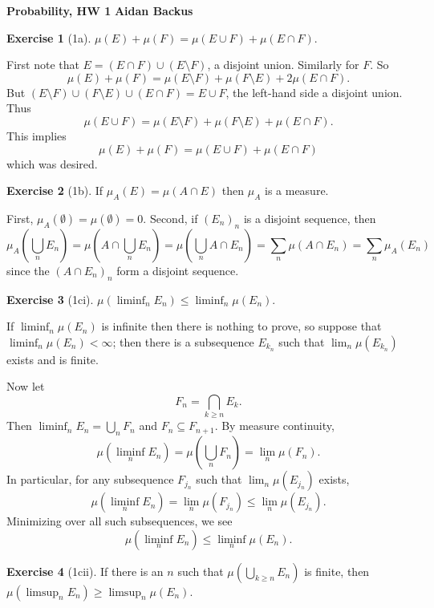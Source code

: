 \documentclass[10pt]{article}
\theoremstyle{definition}
\newtheorem{exer}{Exercise}
\begin{document}
\noindent
\large\textbf{Probability, HW 1} \hfill \textbf{Aidan Backus} \\


\begin{exer}[1a]
$\mu(E) + \mu(F) = \mu(E \cup F) + \mu(E \cap F)$.
\end{exer}
First note that $E = (E \cap F) \cup (E \setminus F)$, a disjoint union. Similarly for $F$. So
$$\mu(E) + \mu(F) = \mu(E \setminus F) + \mu(F \setminus E) + 2 \mu(E \cap F).$$
But $(E \setminus F) \cup (F \setminus E) \cup (E \cap F) = E \cup F$, the left-hand side a disjoint union. Thus
$$\mu(E \cup F) = \mu(E \setminus F) + \mu(F \setminus E) + \mu(E \cap F).$$
This implies
$$\mu(E) + \mu(F) = \mu(E \cup F) + \mu(E \cap F)$$
which was desired.

\begin{exer}[1b]
If $\mu_A(E) = \mu(A \cap E)$ then $\mu_A$ is a measure.
\end{exer}

First, $\mu_A(\emptyset) = \mu(\emptyset) = 0$. Second, if $(E_n)_n$ is a disjoint sequence, then
$$\mu_A\left(\bigcup_n E_n\right) = \mu\left(A \cap \bigcup_n E_n\right) = \mu\left(\bigcup_n A \cap E_n\right) = \sum_n \mu(A \cap E_n) = \sum_n \mu_A(E_n)$$
since the $(A \cap E_n)_n$ form a disjoint sequence.

\begin{exer}[1ci]
$\mu(\liminf_n E_n) \leq \liminf_n \mu(E_n)$.
\end{exer}

If $\liminf_n \mu(E_n)$ is infinite then there is nothing to prove, so suppose that $\liminf_n \mu(E_n) < \infty$; then there is a subsequence $E_{k_n}$ such that $\lim_n \mu(E_{k_n})$ exists and is finite.

Now let
$$F_n = \bigcap_{k \geq n} E_k.$$
Then $\liminf_n E_n = \bigcup_n F_n$ and $F_n \subseteq F_{n+1}$. By measure continuity,
$$\mu\left(\liminf_n E_n\right) = \mu\left(\bigcup_n F_n\right) = \lim_n \mu(F_n).$$
In particular, for any subsequence $F_{j_n}$ such that $\lim_n \mu(E_{j_n})$ exists,
$$\mu\left(\liminf_n E_n\right) = \lim_n \mu(F_{j_n}) \leq \lim_n \mu(E_{j_n}).$$
Minimizing over all such subsequences, we see
$$\mu\left(\liminf_n E_n\right) \leq \liminf_n \mu(E_n).$$

\begin{exer}[1cii]
If there is an $n$ such that $\mu(\bigcup_{k \geq n} E_n)$ is finite, then
$\mu(\limsup_n E_n) \geq \limsup_n \mu(E_n)$.
\end{exer}
\end{document}
